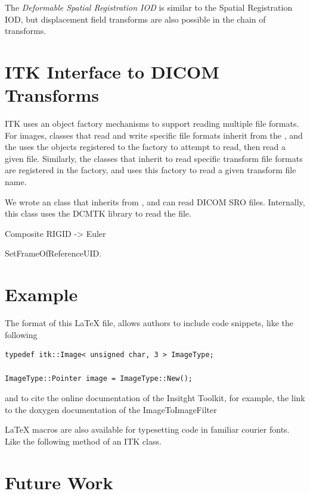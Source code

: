\documentclass{InsightArticle}
\begin{document}
The \textit{Deformable Spatial Registration IOD} is similar to the Spatial
Registration IOD, but displacement field transforms are also possible in the
chain of transforms.

\section{ITK Interface to DICOM Transforms}

ITK uses an object factory mechanisms to support reading multiple file
formats.  For images, classes that read and write specific file formats
inherit from the , and the  uses
the objects registered to the factory to attempt to read, then read a given
file.  Similarly, the classes that inherit 
to read specific transform file formats are registered in the factory, and
 uses this factory to read a given
transform file name.

We wrote an  class that inherits from
, and can read DICOM SRO files. Internally,
this class uses the DCMTK library \cite{DCMTK} to read the file.

Composite
RIGID -> Euler

SetFrameOfReferenceUID.


\section{Example}

The format of this LaTeX file, allows authors to include code snippets, like
the following

\small
\begin{verbatim}
typedef itk::Image< unsigned char, 3 > ImageType;

ImageType::Pointer image = ImageType::New();
\end{verbatim}
\normalsize

and to cite the online documentation of the Insitght Toolkit, for example, the
link to the doxygen documentation of the ImageToImageFilter


LaTeX macros are also available for typesetting code in familiar courier fonts.
Like the following method of an ITK class.


\section{Future Work}
\end{document}
